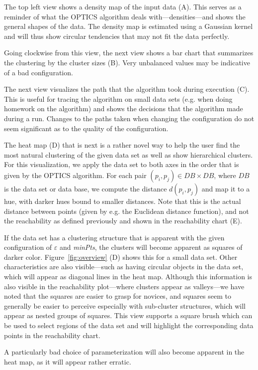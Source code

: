 \documentclass{vgtc} %
\begin{document}
The top left view shows a density map of the input data (A). This serves as a reminder
of what the OPTICS algorithm deals with---densities---and shows the general shapes of
the data. The density map is estimated using a Gaussian kernel and will thus show
circular tendencies that may not fit the data perfectly.

Going clockwise from this view, the next view shows a bar chart that summarizes the
clustering by the cluster sizes (B). Very unbalanced values may be indicative of a bad
configuration.

The next view visualizes the path that the algorithm took during execution (C).
This is useful for tracing the algorithm on small data sets (e.g. when doing
homework on the algorithm) and shows the decisions that the algorithm made
during a run. Changes to the paths taken when changing the configuration do not
seem significant as to the quality of the configuration.

The heat map (D) that is next is a rather novel way to help the user find the most
natural clustering of the given data set as well as show hierarchical clusters.
For this visualization, we apply the data set to both axes in the order that is
given by the OPTICS algorithm. For each pair $(p_i, p_j) \in DB \times
DB$, where $DB$ is the data set or data base, we compute the distance
$d(p_i, p_j)$ and map it to a hue, with darker hues bound to smaller distances.
Note that this is the actual distance between points (given by e.g. the
Euclidean distance function), and not the reachability as defined previously and
shown in the reachability chart (E).

If the data set has a clustering structure that is apparent with the given
configuration of $\varepsilon$ and \emph{minPts}, the clusters will become
apparent as squares of darker color. Figure~\ref{fig:overview} (D) shows this for a
small data set. Other characteristics are also visible---such as having
circular objects in the data set, which will appear as diagonal lines in the
heat map. Although this information is also visible in the reachability
plot---where clusters appear as valleys---we have noted that the squares
are easier to grasp for novices, and squares seem to generally be easier to perceive
especially with sub-cluster structures, which will appear as nested groups of
squares. This view supports a square brush which can be used to select regions
of the data set and will highlight the corresponding data points in the
reachability chart.

A particularly bad choice of parameterization will also become apparent in the
heat map, as it will appear rather erratic.
\end{document}

